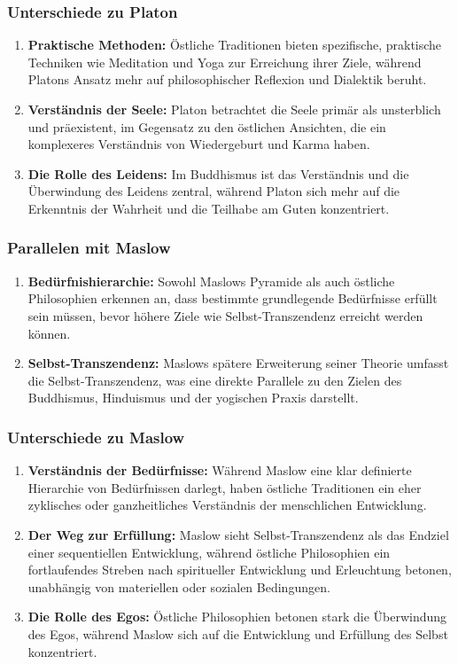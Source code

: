 \documentclass[12pt,a4paper]{article}
\begin{document}
\subsubsection*{Unterschiede zu Platon}
\begin{enumerate}
  \item \textbf{Praktische Methoden:} Östliche Traditionen bieten spezifische, praktische Techniken wie Meditation und Yoga zur Erreichung ihrer Ziele, während Platons Ansatz mehr auf philosophischer Reflexion und Dialektik beruht.
  \item \textbf{Verständnis der Seele:} Platon betrachtet die Seele primär als unsterblich und präexistent, im Gegensatz zu den östlichen Ansichten, die ein komplexeres Verständnis von Wiedergeburt und Karma haben.
  \item \textbf{Die Rolle des Leidens:} Im Buddhismus ist das Verständnis und die Überwindung des Leidens zentral, während Platon sich mehr auf die Erkenntnis der Wahrheit und die Teilhabe am Guten konzentriert.
\end{enumerate}

\subsubsection*{Parallelen mit Maslow}
\begin{enumerate}
  \item \textbf{Bedürfnishierarchie:} Sowohl Maslows Pyramide als auch östliche Philosophien erkennen an, dass bestimmte grundlegende Bedürfnisse erfüllt sein müssen, bevor höhere Ziele wie Selbst-Transzendenz erreicht werden können.
  \item \textbf{Selbst-Transzendenz:} Maslows spätere Erweiterung seiner Theorie umfasst die Selbst-Transzendenz, was eine direkte Parallele zu den Zielen des Buddhismus, Hinduismus und der yogischen Praxis darstellt.
\end{enumerate}

\subsubsection*{Unterschiede zu Maslow}
\begin{enumerate}
  \item \textbf{Verständnis der Bedürfnisse:} Während Maslow eine klar definierte Hierarchie von Bedürfnissen darlegt, haben östliche Traditionen ein eher zyklisches oder ganzheitliches Verständnis der menschlichen Entwicklung.
  \item \textbf{Der Weg zur Erfüllung:} Maslow sieht Selbst-Transzendenz als das Endziel einer sequentiellen Entwicklung, während östliche Philosophien ein fortlaufendes Streben nach spiritueller Entwicklung und Erleuchtung betonen, unabhängig von materiellen oder sozialen Bedingungen.
  \item \textbf{Die Rolle des Egos:} Östliche Philosophien betonen stark die Überwindung des Egos, während Maslow sich auf die Entwicklung und Erfüllung des Selbst konzentriert.
\end{enumerate}
\end{document}
